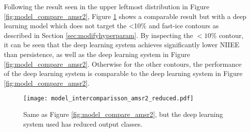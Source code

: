 \documentclass[../main/thesis.tex]{subfiles}
\begin{document}
Following the result seen in the upper leftmost distribution in Figure \ref{fig:model_compare_amsr2}, Figure \ref{fig:model_compare_amsr2_reduced} shows a comparable result but with a deep learning model which does not target the <10\% and fast-ice contours as described in Section \ref{sec:modifyhyperparam}. By inspecting the $<10\%$ contour, it can be seen that the deep learning system achieves significantly lower NIIEE than persistence, as well as the deep learning system in Figure \ref{fig:model_compare_amsr2}. Otherwise for the other contours, the performance of the deep learning system is comparable to the deep learning system in Figure \ref{fig:model_compare_amsr2}.

\begin{figure}
    \centering
    \texttt{[image: model\_intercomparisson\_amsr2\_reduced.pdf]}
    \caption{\label{fig:model_compare_amsr2_reduced}Same as Figure \ref{fig:model_compare_amsr2}, but the deep learning system used has reduced output classes.}
\end{figure}

\biblio
\end{document}
